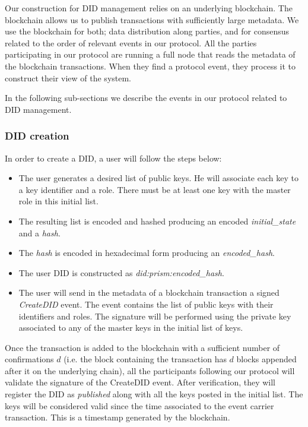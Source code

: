 \documentclass[10pt,a4paper]{article}
\begin{document}
Our construction for DID management relies on an underlying blockchain. The blockchain allows us to publish transactions with sufficiently large metadata. We use the blockchain for both; data distribution along parties, and for consensus related to the order of relevant events in our protocol. All the parties participating in our protocol are running a full node that reads the metadata of the blockchain transactions. When they find a protocol event, they process it to construct their view of the system.

In the following sub-sections we describe the events in our protocol related to DID management.

\subsubsection{DID creation}

In order to create a DID, a user will follow the steps below:

\begin{itemize}
\item The user generates a desired list of public keys. He will associate each key to a key identifier and a role.
      There must be at least one key with the master role in this initial list.
\item The resulting list is encoded and hashed producing an encoded \emph{initial\_state} and a \emph{hash}.
\item The \emph{hash} is encoded in hexadecimal form producing an \emph{encoded\_hash}.
\item The user DID is constructed as \emph{did:prism:encoded\_hash}.
\item The user will send in the metadata of a blockchain transaction a signed \emph{CreateDID} event. 
      The event contains the list of public keys with their identifiers and roles.
      The signature will be performed using the private key associated to any of the master keys in the initial list of keys.
\end{itemize}

Once the transaction is added to the blockchain with a sufficient number of confirmations $d$ (i.e. the block containing the transaction has $d$ blocks appended after it on the underlying chain), all the participants following our protocol will validate the signature of the CreateDID event. After verification, they will register the DID as \emph{published} along with all the keys posted in the initial list. The keys will be considered valid since the time associated to the event carrier transaction. This is a timestamp generated by the blockchain.
\end{document}
